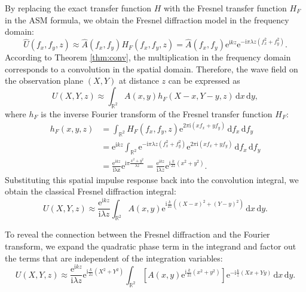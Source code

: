 \documentclass[12pt]{article}
\begin{document}
By replacing the exact transfer function \( H \) with the Fresnel transfer function \( H_F \) in the ASM
formula, we obtain the Fresnel diffraction model in the frequency domain:
\[
    \hat{U}(f_x, f_y, z) \approx \hat{A}(f_x, f_y) H_F(f_x, f_y, z) = \hat{A}(f_x, f_y) \mathrm{e}^
    {\mathrm{i}kz} \mathrm{e}^{-\mathrm{i} \pi \lambda z (f_x^2 + f_y^2)}.
\]
According to Theorem \ref{thm:conv}, the multiplication in the frequency domain corresponds to a 
convolution in the spatial domain. Therefore, the wave field on the observation plane \( (X, Y) \) at
distance \( z \) can be expressed as
\[
    U(X, Y, z) \approx \int_{\mathbb{R}^2} A(x, y) h_F(X - x, Y - y, z) \, \mathrm{d}x \, \mathrm{d}y,
\]
where \( h_F \) is the inverse Fourier transform of the Fresnel transfer function \( H_F \):
\begin{align*}
    h_F(x, y, z) &= \int_{\mathbb{R}^2} H_F(f_x, f_y, z) \mathrm{e}^{2\pi \mathrm{i} (x f_x + y f_y)}\,
    \mathrm{d}f_x \, \mathrm{d}f_y \\
    &= \mathrm{e}^{\mathrm{i} k z} \int_{\mathbb{R}^2} \mathrm{e}^{-\mathrm{i} \pi \lambda z (f_x^2 + f_y^2)}
    \mathrm{e}^{2\pi \mathrm{i} (x f_x + y f_y)}\, \mathrm{d}f_x \, \mathrm{d}f_y \\
    &= \frac{\mathrm{e}^{\mathrm{i} k z}}{\mathrm{i \lambda z} } \mathrm{e}^{\mathrm{i} \pi 
    \frac{x^2 + y^2}{\lambda z}} 
    = \frac{\mathrm{e}^{\mathrm{i} k z}}{\mathrm{i} \lambda z} \mathrm{e}^{\mathrm{i} \frac{k}{2z}
    (x^2 + y^2)}.
\end{align*}
Substituting this spatial impulse response back into the convolution integral, 
we obtain the classical Fresnel diffraction integral:
\[
    U(X, Y, z) \approx \frac{\mathrm{e}^{\mathrm{i} k z}}{\mathrm{i} \lambda z} \int_{\mathbb{R}^2} A(x, y) 
    \mathrm{e}^{\mathrm{i} \frac{k}{2z} ((X - x)^2 + (Y - y)^2)} \, \mathrm{d}x \, \mathrm{d}y.
\]

To reveal the connection between the Fresnel diffraction and the Fourier transform, we expand the quadratic 
phase term in the integrand and factor out the terms that are independent of the integration variables:
\begin{equation}\label{eq:Fresnel}
    U(X, Y, z) \approx \frac{\mathrm{e}^{\mathrm{i} k z}}{\mathrm{i} \lambda z} \mathrm{e}^{\mathrm{i}
    \frac{k}{2z} (X^2 + Y^2)} \int_{\mathbb{R}^2} \left[ A(x, y) \mathrm{e}^{\mathrm{i} \frac{k}{2z} 
    (x^2 + y^2)} \right]
    \mathrm{e}^{-\mathrm{i} \frac{k}{z} (X x + Y y)} \, \mathrm{d}x \, \mathrm{d}y.
\end{equation}
\end{document}

